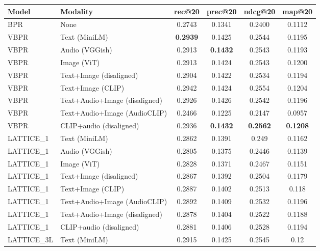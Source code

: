 \begin{table}[H]
    \centering
    \begin{adjustbox}{max width=\textwidth}
    \begin{tabular}{|l|l|c|c|c|c|}
    \hline
    	\textbf{Model} & \textbf{Modality} & \textbf{rec@20} & \textbf{prec@20} & \textbf{ndcg@20} & \textbf{map@20} \\
    \hline
    BPR & None & 0.2743 & 0.1341 & 0.2400 & 0.1112 \\
    \hline
    VBPR & Text (MiniLM) & \textbf{0.2939} & 0.1425 & 0.2544 & 0.1195 \\
    \hline
    VBPR & Audio (VGGish) & 0.2913 & \textbf{0.1432} & 0.2543 & 0.1193 \\
    \hline
    VBPR & Image (ViT) & 0.2913 & 0.1424 & 0.2543 & 0.1200 \\
    \hline
    VBPR & Text+Image (disaligned) & 0.2904 & 0.1422 & 0.2534 & 0.1194 \\
    \hline
    VBPR & Text+Image (CLIP) & 0.2942 & 0.1424 & 0.2554 & 0.1204 \\
    \hline
    VBPR & Text+Audio+Image (disaligned) & 0.2926 & 0.1426 & 0.2542 & 0.1196 \\
    \hline
    VBPR & Text+Audio+Image (AudioCLIP) & 0.2466 & 0.1225 & 0.2147 & 0.0957 \\
    \hline
    VBPR & CLIP+audio (disaligned) & 0.2936 & \textbf{0.1432} & \textbf{0.2562} & \textbf{0.1208} \\
    \hline
    LATTICE\_1 & Text (MiniLM) & 0.2862 & 0.1391 & 0.249 & 0.1162 \\
    \hline
    LATTICE\_1 & Audio (VGGish) & 0.2805 & 0.1375 & 0.2446 & 0.1139 \\
    \hline
    LATTICE\_1 & Image (ViT) & 0.2828 & 0.1371 & 0.2467 & 0.1151 \\
    \hline
    LATTICE\_1 & Text+Image (disaligned) & 0.2867 & 0.1392 & 0.2504 & 0.1179 \\
    \hline
    LATTICE\_1 & Text+Image (CLIP) & 0.2887 & 0.1402 & 0.2513 & 0.118 \\
    \hline
    LATTICE\_1 & Text+Audio+Image (AudioCLIP) & 0.2892 & 0.1409 & 0.2532 & 0.1196 \\
    \hline
    LATTICE\_1 & Text+Audio+Image (disaligned) & 0.2878 & 0.1404 & 0.2522 & 0.1188 \\
    \hline
    LATTICE\_1 & CLIP+audio (disaligned) & 0.2881 & 0.1406 & 0.2528 & 0.1194 \\
    \hline
    LATTICE\_3L & Text (MiniLM) & 0.2915 & 0.1425 & 0.2545 & 0.12 \\

\end{tabular}
\end{adjustbox}
\end{table}

